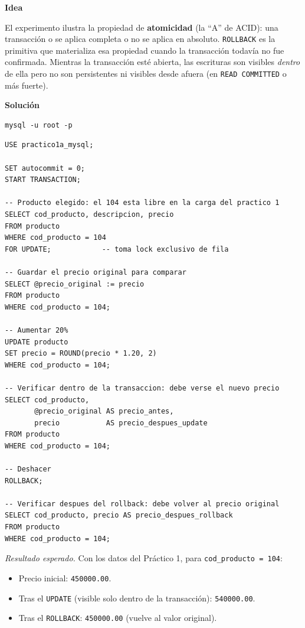 \documentclass[11pt,a4paper]{article}
\newcommand{\itemcabecera}[1]{\noindent\textbf{#1}\par\medskip}
\newcommand{\bloqueIdea}{\itemcabecera{Idea}}
\newcommand{\bloqueSolucion}{\itemcabecera{Soluci\'on}}
\begin{document}
\bloqueIdea

El experimento ilustra la propiedad de \textbf{atomicidad} (la ``A'' de ACID): una transacción o se aplica completa o no se aplica en absoluto. \texttt{ROLLBACK} es la primitiva que materializa esa propiedad cuando la transacción todavía no fue confirmada. Mientras la transacción esté abierta, las escrituras son visibles \emph{dentro} de ella pero no son persistentes ni visibles desde afuera (en \texttt{READ COMMITTED} o más fuerte).

\bloqueSolucion

\begin{lstlisting}[style=shellstyle]
mysql -u root -p
\end{lstlisting}

\begin{lstlisting}
USE practico1a_mysql;

SET autocommit = 0;
START TRANSACTION;

-- Producto elegido: el 104 esta libre en la carga del practico 1
SELECT cod_producto, descripcion, precio
FROM producto
WHERE cod_producto = 104
FOR UPDATE;            -- toma lock exclusivo de fila

-- Guardar el precio original para comparar
SELECT @precio_original := precio
FROM producto
WHERE cod_producto = 104;

-- Aumentar 20%
UPDATE producto
SET precio = ROUND(precio * 1.20, 2)
WHERE cod_producto = 104;

-- Verificar dentro de la transaccion: debe verse el nuevo precio
SELECT cod_producto,
       @precio_original AS precio_antes,
       precio           AS precio_despues_update
FROM producto
WHERE cod_producto = 104;

-- Deshacer
ROLLBACK;

-- Verificar despues del rollback: debe volver al precio original
SELECT cod_producto, precio AS precio_despues_rollback
FROM producto
WHERE cod_producto = 104;
\end{lstlisting}

\textit{Resultado esperado.} Con los datos del Práctico 1, para \texttt{cod\_producto = 104}:

\begin{itemize}
    \item Precio inicial: \texttt{450000.00}.
    \item Tras el \texttt{UPDATE} (visible solo dentro de la transacción): \texttt{540000.00}.
    \item Tras el \texttt{ROLLBACK}: \texttt{450000.00} (vuelve al valor original).
\end{itemize}
\end{document}
